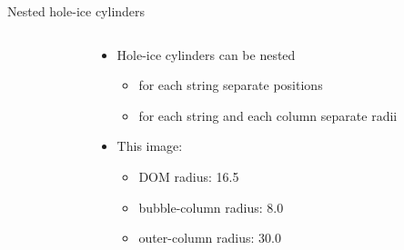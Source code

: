 
\begin{frame}[fragile]{Nested hole-ice cylinders}

  \begin{columns}
    \begin{column}{0.6\textwidth}


    \end{column}
    \begin{column}{0.4\textwidth}

      \begin{itemize}
        \item Hole-ice cylinders can be nested
          \begin{itemize}
            \item for each string separate positions
            \item for each string and each column separate radii
          \end{itemize}
        \item This image:
          \begin{itemize}
            \item DOM radius: 16.5\cm
            \item bubble-column radius: 8.0\cm
            \item outer-column radius: 30.0\cm
          \end{itemize}
      \end{itemize}


    \end{column}
  \end{columns}

\end{frame}
